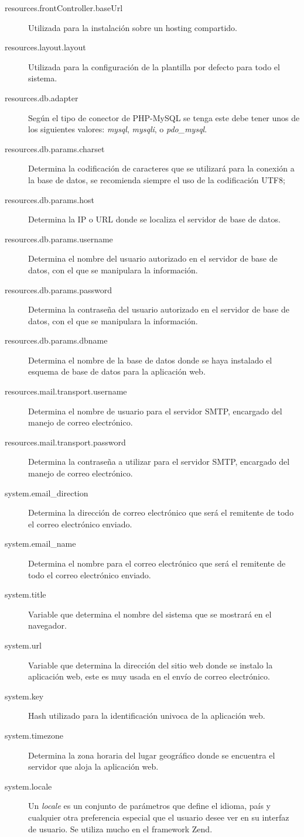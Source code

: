 \begin{description}
\item [resources.frontController.baseUrl] Utilizada para la instalación
sobre un hosting compartido.
\item [resources.layout.layout] Utilizada para la configuración de la
plantilla por defecto para todo el sistema.
\item [resources.db.adapter] Según el tipo de conector de PHP-MySQL se tenga
este debe tener unos de los siguientes valores: \emph{mysql}, \emph{mysqli}, o
\emph{pdo\_mysql}.
\item [resources.db.params.charset] Determina la codificación de caracteres que
se utilizará para la conexión a la base de datos, se recomienda siempre el uso
de la codificación UTF8;
\item [resources.db.params.host] Determina la IP o URL donde se localiza el
servidor de base de datos.
\item [resources.db.params.username] Determina el nombre del usuario autorizado
en el servidor de base de datos, con el que se manipulara la información.
\item [resources.db.params.password] Determina la contraseña del usuario
autorizado en el servidor de base de datos, con el que se manipulara la
información.
\item [resources.db.params.dbname] Determina el nombre de la base de datos donde
se haya instalado el esquema de base de datos para la aplicación web.
\item [resources.mail.transport.username] Determina el nombre de usuario para el
servidor SMTP, encargado del manejo de correo electrónico.
\item [resources.mail.transport.password] Determina la contraseña a utilizar
para el servidor SMTP, encargado del manejo de correo electrónico.
\item [system.email\_direction] Determina la dirección de correo electrónico que
será el remitente de todo el correo electrónico enviado.
\item [system.email\_name] Determina el nombre para el correo electrónico que
será el remitente de todo el correo electrónico enviado.
\item [system.title] Variable que determina el nombre del sistema que se
mostrará en el navegador.
\item [system.url] Variable que determina la dirección del sitio web donde se
instalo la aplicación web, este es muy usada en el envío de correo electrónico.
\item [system.key] Hash utilizado para la identificación univoca de la
aplicación web.
\item [system.timezone] Determina la zona horaria del lugar geográfico donde se
encuentra el servidor que aloja la aplicación web.
\item [system.locale] Un \emph{locale} es un conjunto de parámetros que define
el idioma, país y cualquier otra preferencia especial que el usuario desee ver
en su interfaz de usuario. Se utiliza mucho en el framework Zend.
\end{description}

